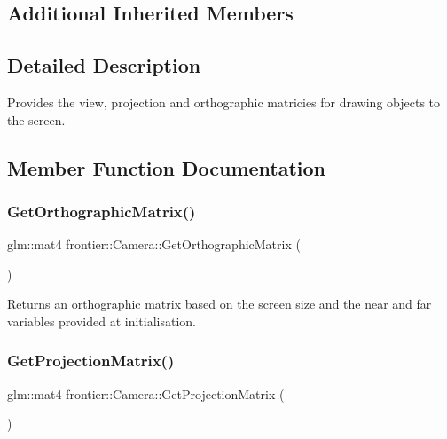 \subsection*{Additional Inherited Members}


\subsection{Detailed Description}
Provides the view, projection and orthographic matricies for drawing objects to the screen. 

\subsection{Member Function Documentation}
\mbox{\label{classfrontier_1_1_camera_a299ffcda274b10443e7f5dfe49a3866e}} 
\subsubsection{\texorpdfstring{Get\+Orthographic\+Matrix()}{GetOrthographicMatrix()}}
{\footnotesize\ttfamily glm\+::mat4 frontier\+::\+Camera\+::\+Get\+Orthographic\+Matrix (\begin{DoxyParamCaption}{ }\end{DoxyParamCaption})}



Returns an orthographic matrix based on the screen size and the near and far variables provided at initialisation. 

\mbox{\label{classfrontier_1_1_camera_a0332baf6ac3b2f062f6da519f6ae2b43}} 
\subsubsection{\texorpdfstring{Get\+Projection\+Matrix()}{GetProjectionMatrix()}}
{\footnotesize\ttfamily glm\+::mat4 frontier\+::\+Camera\+::\+Get\+Projection\+Matrix (\begin{DoxyParamCaption}{ }\end{DoxyParamCaption})}



